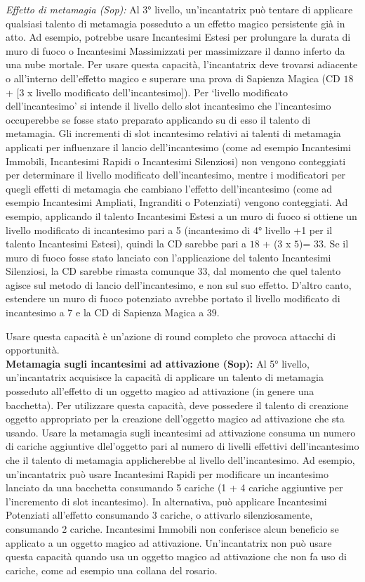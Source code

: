 \documentclass[10pt, a4paper]{report}
\begin{document}
\begin{multicols}{2}
\textit{Effetto di metamagia (Sop):} Al 3° livello, un'incantatrix può tentare di applicare qualsiasi talento di metamagia posseduto a un effetto magico persistente già in atto. Ad esempio, potrebbe usare Incantesimi Estesi per prolungare la durata di muro di fuoco o Incantesimi Massimizzati per massimizzare il danno inferto da una nube mortale. Per usare questa capacità, l'incantatrix deve trovarsi adiacente o all'interno dell'effetto magico e superare una prova di Sapienza Magica (CD $18$ + [$3$ x livello modificato dell'incantesimo]). Per \enquote*{livello modificato dell'incantesimo} si intende il livello dello slot incantesimo che l'incantesimo occuperebbe se fosse stato preparato applicando su di esso il talento di metamagia. Gli incrementi di slot incantesimo relativi ai talenti di metamagia applicati per influenzare il lancio dell'incantesimo (come ad esempio Incantesimi Immobili, Incantesimi Rapidi o Incantesimi Silenziosi) non vengono conteggiati per determinare il livello modificato dell'incantesimo, mentre i modificatori per quegli effetti di metamagia che cambiano l'effetto dell'incantesimo (come ad esempio Incantesimi Ampliati, Ingranditi o Potenziati) vengono conteggiati.
Ad esempio, applicando il talento Incantesimi Estesi a un muro di fuoco si ottiene un livello modificato di incantesimo pari a 5 (incantesimo di 4° livello +1 per il talento Incantesimi Estesi), quindi la CD sarebbe pari a $18$ + ($3$ x $5$)= $33$. Se il muro di fuoco fosse stato lanciato con l'applicazione del talento Incantesimi Silenziosi, la CD sarebbe rimasta comunque $33$, dal momento che quel talento agisce sul metodo di lancio dell'incantesimo, e non sul suo effetto. D'altro canto, estendere un muro di fuoco potenziato avrebbe portato il livello modificato di incantesimo a 7 e la CD di Sapienza Magica a $39$.

Usare questa capacità è un'azione di round completo che provoca attacchi di opportunità.\\

\textbf{Metamagia sugli incantesimi ad attivazione (Sop):} Al 5° livello, un'incantatrix acquisisce la capacità di applicare un talento di metamagia posseduto all'effetto di un oggetto magico ad attivazione (in genere una bacchetta). Per utilizzare questa capacità, deve possedere il talento di creazione oggetto appropriato per la creazione dell'oggetto magico ad attivazione che sta usando. Usare la metamagia sugli incantesimi ad attivazione consuma un numero di cariche aggiuntive dlel'oggetto pari al numero di livelli effettivi dell'incantesimo che il talento di metamagia applicherebbe al livello dell'incantesimo. Ad esempio, un'incantatrix può usare Incantesimi Rapidi per modificare un incantesimo lanciato da una bacchetta consumando 5 cariche (1 + 4 cariche aggiuntive per l'incremento di slot incantesimo). In alternativa, può applicare Incantesimi Potenziati all'effetto consumando 3 cariche, o attivarlo silenziosamente, consumando 2 cariche. Incantesimi Immobili non conferisce alcun beneficio se applicato a un oggetto magico ad attivazione.
Un'incantatrix non può usare questa capacità quando usa un oggetto magico ad attivazione che non fa uso di cariche, come ad esempio una collana del rosario.\\


\end{multicols}
\end{document}
